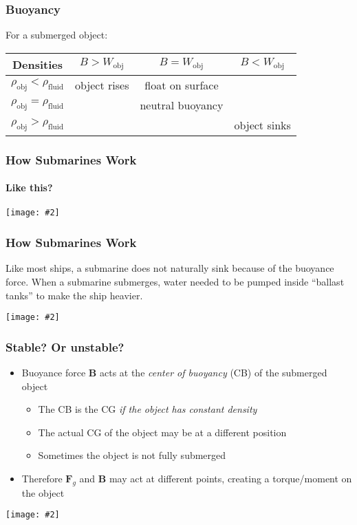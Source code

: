 \documentclass[12pt,aspectratio=169]{beamer}
\newcommand{\pic}[2]{\texttt{[image: \#2]}}
\newcommand{\mb}[1]{\mathbf{#1}}
\begin{document}
\begin{frame}
  \frametitle{Buoyancy}
  For a submerged object:
  \begin{center}
    \begin{tabular}{c|c|c|c}
      \rowcolor{pink}
      Densities	&
      $B>W_{\textrm{obj}}$ &
      $B=W_{\textrm{obj}}$ &
      $B<W_{\textrm{obj}}$ \\\hline
      $\rho_{\textrm{obj}}<\rho_{\textrm{fluid}}$ & object rises & float on surface & \\
      $\rho_{\textrm{obj}}=\rho_{\textrm{fluid}}$ & & neutral buoyancy & \\
      $\rho_{\textrm{obj}}>\rho_{\textrm{fluid}}$ & & & object sinks
    \end{tabular}
  \end{center}
\end{frame}


\begin{frame}
  \frametitle{How Submarines Work}
  \framesubtitle{Like this?}
  \begin{center}
    \pic{.7}{EbHMOXk.jpg}
  \end{center}
\end{frame}


\begin{frame}
  \frametitle{How Submarines Work}
  Like most ships, a submarine does not naturally sink because of the buoyance
  force. When a submarine submerges, water needed to be pumped inside
  ``ballast tanks'' to make the ship heavier.
  \begin{center}
    \pic{1}{risinglemur.jpg}
  \end{center}
\end{frame}


\begin{frame}
  \frametitle{Stable? Or unstable?}
  \begin{itemize}
  \item Buoyance force $\mb{B}$ acts at the \emph{center of buoyancy} (CB) of
    the submerged object
    \begin{itemize}
    \item The CB is the CG \emph{if the object has constant density}
    \item The actual CG of the object may be at a different position
    \item Sometimes the object is not fully submerged
    \end{itemize}
  \item Therefore $\mb{F}_g$ and $\mb{B}$ may act at different points, creating
    a torque/moment on the object
  \end{itemize}
  \begin{center}
    \vspace{-.15in}\pic{.6}{stable-unstable.jpg}
  \end{center}
\end{frame}
\end{document}
